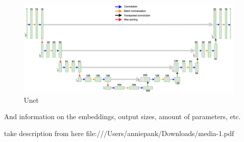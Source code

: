\begin{figure}[htb]
	\begin{center}
		\includegraphics[width=\linewidth]{bilder/Unet.png}
		\caption{Unet}\label{fig:unet}
	\end{center}
\end{figure}
And information on the embeddings, output sizes, amount of parameters, etc.

take description from here
file:///Users/anniepank/Downloads/media-1.pdf